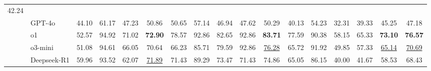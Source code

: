 \begin{table}[t!]
{\begin{tabular}{llccccccccccccccc}
  42.24 \\
 &
  \cellcolor[HTML]{EFEFEF}GPT-4o &
  {\color[HTML]{9B9B9B} 44.10} &
  {\color[HTML]{9B9B9B} 61.17} &
  {\color[HTML]{9B9B9B} 47.23} &
  50.86 &
  {\color[HTML]{9B9B9B} 50.65} &
  {\color[HTML]{9B9B9B} 57.14} &
  {\color[HTML]{9B9B9B} 46.94} &
  {\color[HTML]{9B9B9B} 47.62} &
  50.29 &
  {{\color[HTML]{9B9B9B} 40.13}} &
  {{\color[HTML]{9B9B9B} 54.23}} &
  {{\color[HTML]{9B9B9B} 32.31}} &
  {{\color[HTML]{9B9B9B} 39.33}} &
  {45.25} &
  47.18 \\
 &
  \cellcolor[HTML]{EFEFEF}o1 &
  {\color[HTML]{9B9B9B} 52.57} &
  {\color[HTML]{9B9B9B} 94.92} &
  {\color[HTML]{9B9B9B} 71.02} &
  \textbf{72.90} &
  {\color[HTML]{9B9B9B} 78.57} &
  {\color[HTML]{9B9B9B} 92.86} &
  {\color[HTML]{9B9B9B} 82.65} &
  {\color[HTML]{9B9B9B} 92.86} &
  \textbf{83.71} &
  {{\color[HTML]{9B9B9B} 77.59}} &
  {{\color[HTML]{9B9B9B} 90.38}} &
  {{\color[HTML]{9B9B9B} 58.15}} &
  {{\color[HTML]{9B9B9B} 65.33}} &
  \textbf{73.10} &
  \textbf{76.57} \\
 &
  \cellcolor[HTML]{EFEFEF}o3-mini &
  {\color[HTML]{9B9B9B} 51.08} &
  {\color[HTML]{9B9B9B} 94.61} &
  {\color[HTML]{9B9B9B} 66.05} &
  70.64 &
  {\color[HTML]{9B9B9B} 66.23} &
  {\color[HTML]{9B9B9B} 85.71} &
  {\color[HTML]{9B9B9B} 79.59} &
  {\color[HTML]{9B9B9B} 92.86} &
  {\underline{76.28}} &
  {{\color[HTML]{9B9B9B} 65.72}} &
  {{\color[HTML]{9B9B9B} 91.92}} &
  {{\color[HTML]{9B9B9B} 49.85}} &
  {{\color[HTML]{9B9B9B} 57.33}} &
  \underline{65.14} &
  \underline{70.69} \\
 &
  \cellcolor[HTML]{EFEFEF}Deepseek-R1 &
  {\color[HTML]{9B9B9B} 59.96} &
  {\color[HTML]{9B9B9B} 93.52} &
  {\color[HTML]{9B9B9B} 62.07} &
  {\underline{71.89}} &
  {\color[HTML]{9B9B9B} 71.43} &
  {\color[HTML]{9B9B9B} 89.29} &
  {\color[HTML]{9B9B9B} 73.47} &
  {\color[HTML]{9B9B9B} 71.43} &
  74.86 &
  {{\color[HTML]{9B9B9B} 65.05}} &
  {{\color[HTML]{9B9B9B} 86.15}} &
  {{\color[HTML]{9B9B9B} 40.00}} &
  {{\color[HTML]{9B9B9B} 41.67}} &
  58.53 &
  {68.43}\\\bottomrule
\end{tabular}%
}
\vspace{-1\baselineskip}
\end{table}

